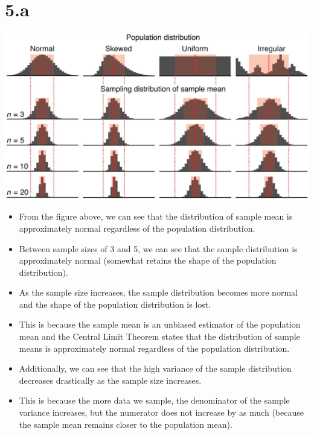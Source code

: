 \documentclass[12pt]{article}
\begin{document}
\section*{5.a}
\includegraphics*[width=\linewidth]{graph5a}
\begin{itemize}
    \item From the figure above, we can see that the distribution of sample mean
    is approximately normal regardless of the population distribution.
    \item Between sample sizes of 3 and 5, we can see that the sample distribution
    is approximately normal (somewhat retains the shape of the population distribution).
    \item As the sample size increases, the sample distribution becomes more
    normal and the shape of the population distribution is lost.
    \item This is because the sample mean is an unbiased estimator of the population
    mean and the Central Limit Theorem states that the distribution of sample
    means is approximately normal regardless of the population distribution.
    \item Additionally, we can see that the high variance of the sample distribution
    decreases drastically as the sample size increases.
    \item This is because the more data we sample, the denominator of the sample
    variance increases, but the numerator does not increase by as much (because
    the sample mean remains closer to the population mean).

\end{itemize}
\end{document}
